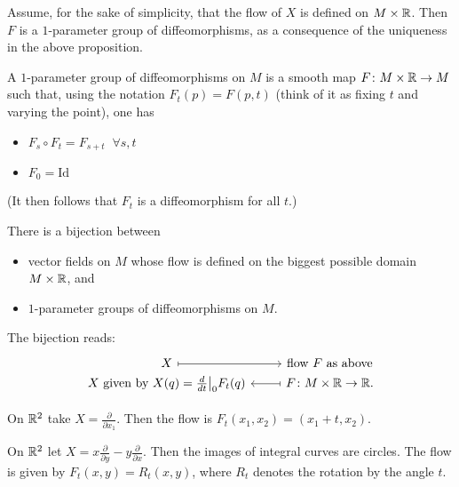     Assume, for the sake of simplicity, that the flow of $X$ is defined on $M \times \mathbb{R}$.   Then $F$ is a $1$-parameter group of diffeomorphisms, as a consequence of the uniqueness in the above proposition.
 \begin{definition}
  A $1$-parameter group of diffeomorphisms on $M$ is a smooth map $F\colon M \times \mathbb{R} \to M$ such that,
using the notation $F_t(p) = F(p, t)$ (think of it as fixing  $t$ and varying the point), one has  
     \begin{itemize}
        \item $F_s  \circ  F_t = F_{s+t} \;\;\forall s,t$
        \item  $F_0 = \text{Id}$
    \end{itemize}
(It then follows that $F_t$ is a diffeomorphism for all $t$.)
\end{definition}


   
    
    
     
\begin{remark}
    There is a bijection between 
    \begin{itemize}
\item vector fields on $M$ whose flow is defined on the biggest possible domain $M \times \mathbb{R}$, and 
\item $1$-parameter groups of diffeomorphisms on $M$.
\end{itemize}
The bijection reads:
    \[
        \begin{tikzcd}[row sep=0em]
        X \arrow[r, mapsto] & \text{flow } F \text{ as above}\\
 X \text{ given by }  X(q)=\frac{d}{dt}\big|_0 F_t(q) & \arrow[l, mapsto] F\colon M \times \R\to \R.
    \end{tikzcd}
    \] 
\end{remark}
\begin{eg}
    On $\mathbb{R}^2$ take $X = \frac{\partial }{\partial x_{1}}$.
    Then the flow is $F_t(x_1, x_2) = (x_1 + t, x_2)$.
\end{eg}

\begin{eg}
    On $\mathbb{R}^2$ let $X = x \frac{\partial }{\partial y}  - y \frac{\partial }{\partial x}$. Then the images of integral curves are circles.
  The flow is  given by  $F_t(x, y) = R_t  (x, y)$, where $R_t$ denotes the rotation by the angle $t$.
\end{eg}
